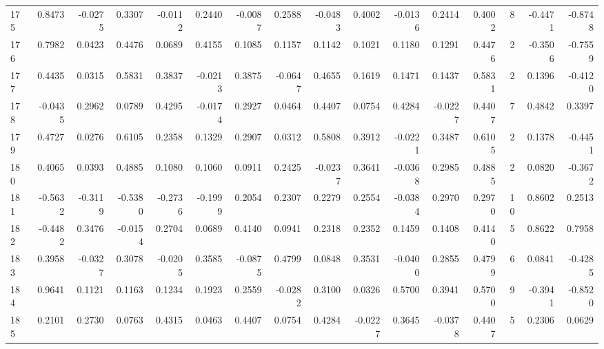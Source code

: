 \begin{tabular}{lrrrrrrrrrrrrrrr}
175 &      0.8473 & -0.0275 &  0.3307 & -0.0112 &  0.2440 & -0.0087 &  0.2588 & -0.0483 &  0.4002 & -0.0136 &   0.2414 &     0.4002 &      8 &                   -0.4471 &                    -0.8748 \\
176 &      0.7982 &  0.0423 &  0.4476 &  0.0689 &  0.4155 &  0.1085 &  0.1157 &  0.1142 &  0.1021 &  0.1180 &   0.1291 &     0.4476 &      2 &                   -0.3506 &                    -0.7559 \\
177 &      0.4435 &  0.0315 &  0.5831 &  0.3837 & -0.0213 &  0.3875 & -0.0647 &  0.4655 &  0.1619 &  0.1471 &   0.1437 &     0.5831 &      2 &                    0.1396 &                    -0.4120 \\
178 &     -0.0435 &  0.2962 &  0.0789 &  0.4295 & -0.0174 &  0.2927 &  0.0464 &  0.4407 &  0.0754 &  0.4284 &  -0.0227 &     0.4407 &      7 &                    0.4842 &                     0.3397 \\
179 &      0.4727 &  0.0276 &  0.6105 &  0.2358 &  0.1329 &  0.2907 &  0.0312 &  0.5808 &  0.3912 & -0.0221 &   0.3487 &     0.6105 &      2 &                    0.1378 &                    -0.4451 \\
180 &      0.4065 &  0.0393 &  0.4885 &  0.1080 &  0.1060 &  0.0911 &  0.2425 & -0.0237 &  0.3641 & -0.0368 &   0.2985 &     0.4885 &      2 &                    0.0820 &                    -0.3672 \\
181 &     -0.5632 & -0.3119 & -0.5380 & -0.2736 & -0.1999 &  0.2054 &  0.2307 &  0.2279 &  0.2554 & -0.0384 &   0.2970 &     0.2970 &     10 &                    0.8602 &                     0.2513 \\
182 &     -0.4482 &  0.3476 & -0.0154 &  0.2704 &  0.0689 &  0.4140 &  0.0941 &  0.2318 &  0.2352 &  0.1459 &   0.1408 &     0.4140 &      5 &                    0.8622 &                     0.7958 \\
183 &      0.3958 & -0.0327 &  0.3078 & -0.0205 &  0.3585 & -0.0875 &  0.4799 &  0.0848 &  0.3531 & -0.0400 &   0.2855 &     0.4799 &      6 &                    0.0841 &                    -0.4285 \\
184 &      0.9641 &  0.1121 &  0.1163 &  0.1234 &  0.1923 &  0.2559 & -0.0282 &  0.3100 &  0.0326 &  0.5700 &   0.3941 &     0.5700 &      9 &                   -0.3941 &                    -0.8520 \\
185 &      0.2101 &  0.2730 &  0.0763 &  0.4315 &  0.0463 &  0.4407 &  0.0754 &  0.4284 & -0.0227 &  0.3645 &  -0.0378 &     0.4407 &      5 &                    0.2306 &                     0.0629 \\

\end{tabular}
